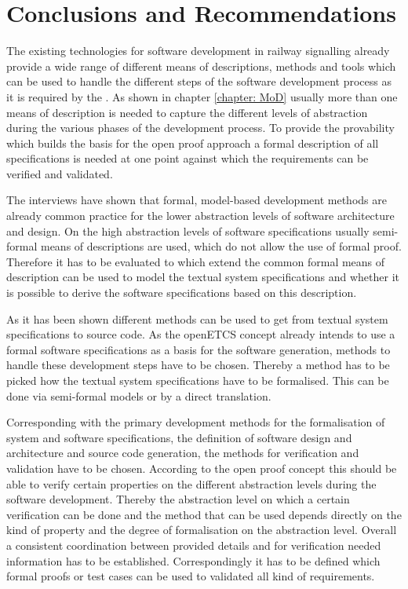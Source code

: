 \documentclass{./template/openetcs_report}
\begin{document}
\chapter{Conclusions and Recommendations}

The existing technologies for software development in railway signalling already provide a wide range of different means of descriptions, methods and tools which can be used to handle the different steps of the software development process as it is required by the \citeauthor{EN50128:2011}. As shown in chapter \ref{chapter: MoD} usually more than one means of description is needed to capture the different levels of abstraction during the various phases of the development process. To provide the provability which builds the basis for the open proof approach a formal description of all specifications is needed at one point against which the requirements can be verified and validated. 

The interviews have shown that formal, model-based development methods are already common practice for the lower abstraction levels of software architecture and design. On the high abstraction levels of  software specifications usually semi-formal means of descriptions are used, which do not allow the use of formal proof. Therefore it has to be evaluated to which extend the common formal means of description can be used to model the textual system specifications and whether it is possible to derive the software specifications based on this description. 

As it has been shown different methods can be used to get from textual system specifications to source code. As the openETCS concept already intends to use a formal software specifications as a basis for the software generation, methods to handle these development steps have to be chosen. Thereby a method has to be picked how the textual system specifications have to be formalised. This can be done via semi-formal models or by a direct translation. 

Corresponding with the primary development methods for the formalisation of system and software specifications, the definition of software design and architecture and source code generation, the methods for verification and validation have to be chosen. According to the open proof concept this should be able to verify certain properties on the different abstraction levels during the software development. Thereby the abstraction level on which a certain verification can be done and the method that can be used depends directly on the kind of property and the degree of formalisation on the abstraction level. Overall a consistent coordination between provided details and for verification needed information has to be established. Correspondingly it has to be defined which formal proofs or test cases can be used to validated all kind of requirements.
\end{document}
